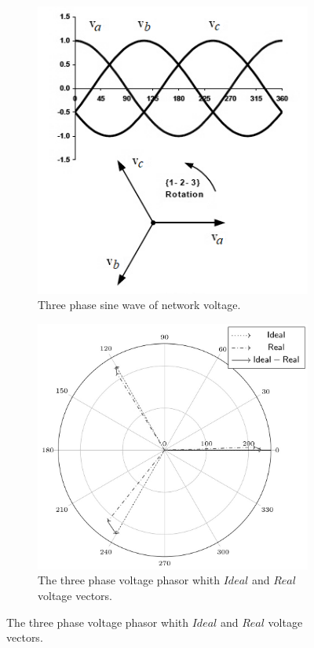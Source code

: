 	\begin{figure}[h!]
     \centering
		\begin{subfigure}[b]{0.49\textwidth}
         \centering
         \includegraphics[width=\textwidth]{Unblance_EPS_Pics/Three-phase-voltage-system_gray.png}
         \caption{Three phase sine wave of network voltage.}
         \label{BASICUNB:fig:UnbWave}
     \end{subfigure}
		\hfill
     \begin{subfigure}[b]{0.49\textwidth}
         \centering
         \includegraphics[width=\textwidth]{Unblance_EPS_Pics/PhasorGrayscale.jpg}
         \caption{The three phase voltage phasor whith $Ideal$ and $Real$ voltage vectors.}
         \label{BASICUNB:fig:UnbPhasor}
     \end{subfigure}
        \label{BASICUNB:fig:UnbPhasor_all}
\end{figure}
	
